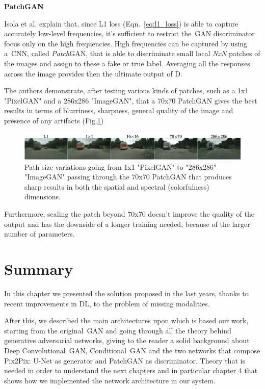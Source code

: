\noindent\textbf{PatchGAN}

\vspace{2mm} %
\noindent Isola et al. explain that, since L1 loss (Eqn.~\ref{eq:l1_loss}) is able to capture accurately low-level frequencies, it's sufficient to restrict the~\ac{GAN} discriminator focus only on the high frequencies.
High frequencies can be captured by using a~\ac{CNN}, called \textit{Patch}GAN\cite{patchgan}, that is able to discriminate small local \textit{NxN} patches of the images and assign to these a fake or true label. Averaging all the responses across the image provides then the ultimate output of D\cite{pix2pix}.

The authors demonstrate, after testing various kinds of patches, such as a 1x1 "PixelGAN" and a 286x286 "ImageGAN", that a 70x70 PatchGAN gives the best results in terms of blurriness, sharpness, general quality of the image and presence of any artifacts (Fig.\ref{fig:nxn})

\begin{figure}[H]
\centering
\includegraphics[height=0.079\textheight]{images/nxn.pdf}
\caption[Patch size variations in PatchGAN discriminator]{Path size variations going from 1x1 "PixelGAN" to "286x286" "ImageGAN" passing through the 70x70 PatchGAN that produces sharp results in both the spatial and spectral (colorfulness) dimensions\cite{pix2pix}.}
\label{fig:nxn}
\end{figure}

Furthermore, scaling the patch beyond 70x70 doesn't improve the quality of the output and has the downside of a longer training needed, because of the larger number of parameters.

\section{Summary}
\label{sec:2nd_section_summary}
In this chapter we presented the solution proposed in the last years, thanks to recent improvements in \ac{DL}, to the problem of missing modalities.

After this, we described the main architectures upon which is based our work, starting from the original~\ac{GAN} and going through all the theory behind generative adversarial networks, giving to the reader a solid background about Deep Convolutional~\ac{GAN}, Conditional~\ac{GAN} and the two networks that compose Pix2Pix: U-Net as generator and PatchGAN as discriminator. Theory that is needed in order to understand the next chapters and in particular chapter 4 that shows how we implemented the network architecture in our system.